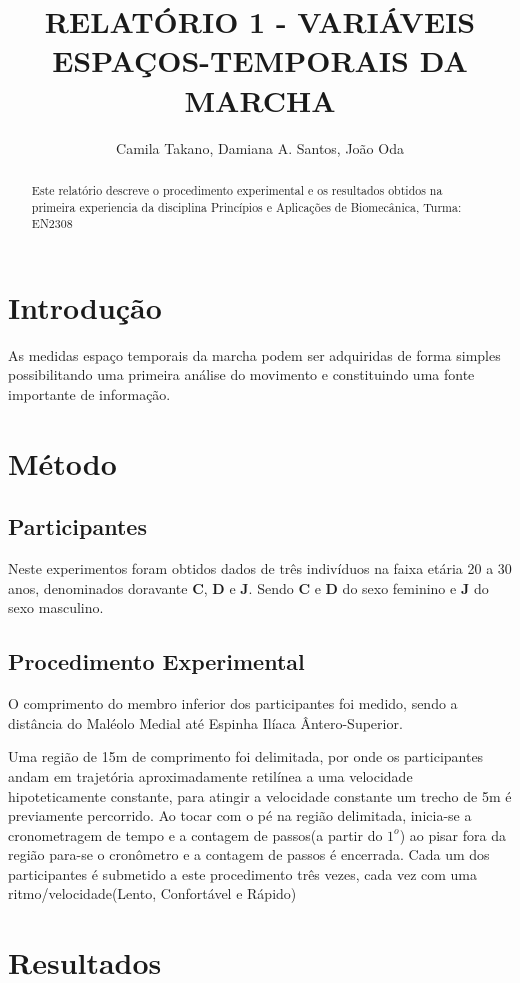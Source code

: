\documentclass[a4paper,10pt]{article}
\title{RELATÓRIO 1 - VARIÁVEIS ESPAÇOS-TEMPORAIS DA MARCHA}
\author{Camila Takano, Damiana A. Santos, João Oda}
\begin{document}
\maketitle

\begin{abstract}
Este relatório descreve o procedimento experimental e os resultados obtidos na primeira experiencia da disciplina Princípios e Aplicações de Biomecânica, Turma: EN2308
\end{abstract}

\section{Introdução}
As medidas espaço temporais da marcha podem ser adquiridas de forma simples possibilitando uma primeira análise do movimento e constituindo uma fonte importante de informação.

\section{Método}

\subsection{Participantes}
Neste experimentos foram obtidos dados de três indivíduos na faixa etária 20 a 30 anos, denominados doravante \textbf{C}, \textbf{D} e \textbf{J}. Sendo \textbf{C} e \textbf{D} do sexo feminino e \textbf{J} do sexo masculino. 

\subsection{Procedimento Experimental}
O comprimento do membro inferior dos participantes foi medido, sendo a distância do 
Maléolo Medial até Espinha Ilíaca Ântero-Superior.

Uma região de 15m de comprimento foi delimitada, por onde os participantes andam em trajetória aproximadamente retilínea a uma velocidade hipoteticamente constante, para atingir a velocidade constante um trecho de 5m é previamente percorrido. Ao tocar com o pé na região delimitada, inicia-se a cronometragem de tempo e a contagem de passos(a partir do $1^o$) ao pisar fora da região para-se o cronômetro e a contagem de passos é encerrada. Cada um dos participantes é submetido a este procedimento três vezes, cada vez com uma ritmo/velocidade(Lento, Confortável e Rápido)

\section{Resultados}
\end{document}
